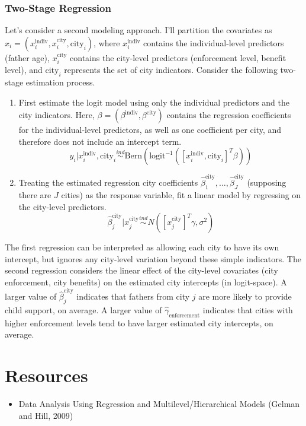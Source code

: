 \documentclass[12pt]{article}
\begin{document}
\subsubsection{Two-Stage Regression}
Let's consider a second modeling approach. I'll partition the covariates as $x_i = (x_i^{\text{indiv}}, x_i^{\text{city}}, \text{city}_i)$, where $x_i^{\text{indiv}}$ contains the individual-level predictors
(father age), $x_i^{\text{city}}$ contains the city-level predictors (enforcement level, benefit level), and $\text{city}_i$ represents the set of city indicators. Consider the following two-stage estimation
process. 
\begin{enumerate}
\item First estimate the logit model using only the individual predictors and the city indicators. Here, $\beta = (\beta^{\text{indiv}}, \beta^{\text{city}})$ contains the regression coefficients for the individual-level 
predictors, as well as one coefficient per city, and therefore does not include an intercept term. 
\[y_i|x_i^{\text{indiv}}, \text{city}_i \overset{ind}{\sim} \text{Bern}(\text{logit}^{-1}([x_i^{\text{indiv}}, \text{city}_i]^T \beta)) \]
\item Treating the estimated regression city coefficients $\hat{\beta}^{\text{city}}_1, \dots, \hat{\beta}^{\text{city}}_J$ (supposing there are $J$ cities) as the response variable, fit a linear model by regressing on the 
city-level predictors. 
\[\hat{\beta}^{\text{city}}_j|x_j^{\text{city}} \overset{ind}{\sim} N([x_j^{\text{city}}]^T \gamma, \sigma^2)\]
\end{enumerate}
The first regression can be interpreted as allowing each city to have its own intercept, but ignores any city-level variation beyond these simple indicators. The second regression considers the linear effect of 
the city-level covariates (city enforcement, city benefits) on the estimated city intercepts (in logit-space). A larger value of $\hat{\beta}^{\text{city}}_j$ indicates that fathers from city $j$ are more likely to provide child support, on average. A larger value of $\hat{\gamma}_{\text{enforcement}}$ indicates that cities with higher enforcement levels tend to have larger estimated city intercepts, on average. 


\section{Resources}
\begin{itemize}
\item Data Analysis Using Regression and Multilevel/Hierarchical Models (Gelman and Hill, 2009)
\end{itemize}
\end{document}
